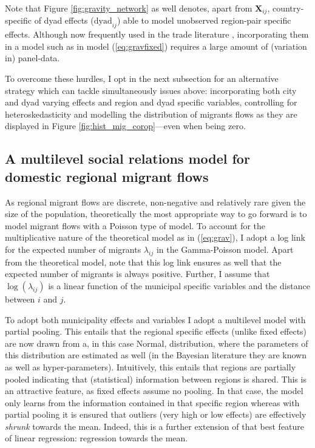 \documentclass[11pt,parskip,abstracton,notitlepage, dvipsnames]{scrartcl}
\begin{document}
Note that Figure \ref{fig:gravity_network} as well denotes, apart from $\mathbf{X}_{ij}$, country-specific of dyad effects ($\text{dyad}_{ij}$) able to model unobserved region-pair specific effects. Although now frequently used in the trade literature \citep{baier2018heterogeneous, baier2019widely}, incorporating them in a model such as in model (\ref{eq:gravfixed}) requires a large amount of (variation in) panel-data.

To overcome these hurdles, I opt in the next subsection for an alternative strategy which 
can tackle simultaneously issues above: incorporating both city and dyad
varying effects and region and dyad specific variables, controlling for heteroskedasticity and modelling the distribution of migrants flows as they are displayed in Figure \ref{fig:hist_mig_corop}---even when
being zero.

\subsection{A multilevel social relations model for domestic regional migrant flows}

As regional migrant flows are discrete, non-negative and relatively
rare given the size of the population, theoretically the most appropriate way to
go forward is to model migrant flows with a Poisson type of model. To account for the multiplicative nature of the theoretical model as in
(\ref{eq:grav}), I adopt a log link for the expected number of migrants
$\lambda_{ij}$ in the Gamma-Poisson model. Apart from the theoretical model,
note that this log link ensures as well that the expected number of migrants is
always positive. Further, I assume that $\log(\lambda_{ij})$ is a linear
function of the municipal specific variables and the distance between $i$ and
$j$.

To adopt both municipality effects and variables I adopt a multilevel
model with partial pooling. This entails that the regional specific effects
(unlike fixed effects) are now drawn from a, in this case Normal, distribution,
where the parameters of this distribution are estimated as well (in the Bayesian
literature they are known as well as hyper-parameters). Intuitively, this
entails that regions are partially pooled indicating that (statistical)
information between regions is shared. This is an attractive feature, as
fixed effects assume no pooling. In that case, the model only learns from the
information contained in that specific region whereas with partial pooling
it is ensured that outliers (very high or low effects) are effectively
\emph{shrunk} towards the mean. Indeed, this is a further extension of that best
feature of linear regression: regression towards the mean.
\end{document}
